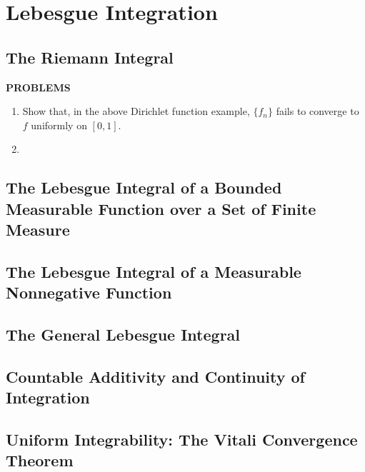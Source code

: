 \chapter{Lebesgue Integration}
\section{The Riemann Integral}

\begin{center}
	\textbf{PROBLEMS}
\end{center}
\begin{enumerate}
	\setcounter{enumi}{0}
    \item Show that, in the above Dirichlet function example, $\{f_n\}$ fails to converge to $f$ uniformly on $[0,1]$.
    \item 
\end{enumerate}

\section{The Lebesgue Integral of a Bounded Measurable Function over a Set of Finite Measure}

\section{The Lebesgue Integral of a Measurable Nonnegative Function}

\section{The General Lebesgue Integral}

\section{Countable Additivity and Continuity of Integration}

\section{Uniform Integrability: The Vitali Convergence Theorem}
